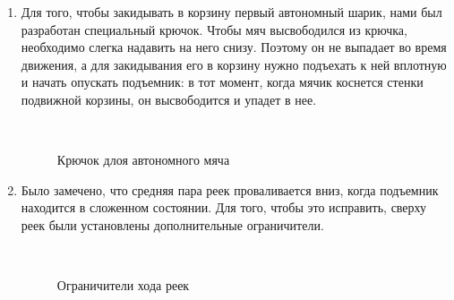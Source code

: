 \begin{enumerate}
\begin{enumerate}
		\item Для того, чтобы закидывать в корзину первый автономный шарик, нами был разработан специальный крючок. Чтобы мяч высвободился из крючка, необходимо слегка надавить на него снизу. Поэтому он не выпадает во время движения, а для закидывания его в корзину нужно подъехать к ней вплотную и начать опускать подъемник: в тот момент, когда мячик коснется стенки подвижной корзины, он высвободится и упадет в нее.
        \begin{figure}[H]
	  	  \begin{minipage}[h]{0.2\linewidth}
	  	    \center  
	  	  \end{minipage}
	  	  \begin{minipage}[h]{0.6\linewidth}
	  	  \end{minipage}
	  	  \caption{Крючок длоя автономного мяча}
	   \end{figure} 
	   
	   \item Было замечено, что средняя пара реек проваливается вниз, когда подъемник находится в сложенном состоянии. Для того, чтобы это исправить, сверху реек были установлены дополнительные ограничители.
	   \begin{figure}[H]
	   	\begin{minipage}[h]{0.2\linewidth}
	   		\center  
	   	\end{minipage}
	   	\begin{minipage}[h]{0.6\linewidth}
	   		\caption{Ограничители хода реек}
	   	\end{minipage}
	   \end{figure}


\end{enumerate}
\end{enumerate}

